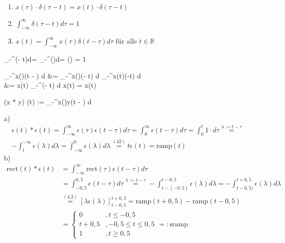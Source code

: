 \documentclass[parskip=half]{scrreprt}
\newcommand{\rect}{\text{rect}}
\newcommand{\ramp}{\text{ramp}}
\newcommand{\sramp}{\text{sramp}}
\begin{document}
\begin{tbox}
 \begin{enumerate}[label=\Roman*)]
 	\item $x(\tau) \cdot \delta(\tau - t) = x(t) \cdot \delta(\tau - t)$
 	\item $\int_{-\infty}^{\infty}\delta(\tau - t)d\tau = 1$
 	\item $x(t) = \int_{-\infty}^{\infty}x(\tau)\delta(t-\tau)d\tau$ für alle $ t \in \mathbb{R}$
 \end{enumerate}
\end{tbox}

\begin{abox}
	\int_{-\infty}^{\infty}\delta(\tau - t)d\tau = \int_{-\infty}^{\infty}\delta(\lambda)d\lambda = \epsilon(\infty) = 1
\end{abox}


\begin{abox}
	\int_{-\infty}^{\infty}x(\tau)\delta(t  - \tau) d \tau &= 	\int_{-\infty}^{\infty}x(\tau)\delta(\tau - t) d \tau {}	\int_{-\infty}^{\infty}x(t)\delta(\tau -t) d \tau \\
	&= x(t)	\int_{-\infty}^{\infty}\delta(\tau - t) d \tau {} x(t)  = x(t)
\end{abox}

\begin{abox}
	(x * y) (t) := 	\int_{-\infty}^{\infty}x(\tau)y(t  - \tau) d \tau
\end{abox}

\begin{tbox}
	a) \begin{align*}\epsilon(t) * \epsilon(t) = \int_{-\infty}^{\infty}\epsilon(\tau)\epsilon(t  - \tau) d \tau = 
	\int_{0}^{\infty}\epsilon(t  - \tau) d \tau = 	\int_{0}^{t}1 \cdot d\tau \overset{\lambda := t-\tau}{=}\\
		-\int_{t}^{-\infty}\epsilon(\lambda) d \lambda = 
			\int_{-\infty}^{0}\epsilon(\lambda) d \lambda \overset{(42)}{=} t\epsilon(t) = \text{ramp}(t)\end{align*}
	b) \begin{align*}
	\text{rect}(t) * \epsilon(t) &= 	\int_{-\infty}^{\infty}\rect(\tau)\epsilon(t  - \tau) d \tau \\&= 
		\int_{-0,5}^{0,5}\epsilon(t  - \tau) d \tau \overset{\lambda := t-\tau}{=}
		-\int_{t-(-0,5)}^{t-0,5}\epsilon(\lambda) d \lambda = 
		-\int_{t-0,5)}^{t+0,5}\epsilon(\lambda) d \lambda\\ &\overset{(4.2)}{=}[\lambda\epsilon(\lambda)]_{t-0,5}^{t+0,5}
		= \ramp(t+0,5) - \ramp(t-0,5)\\
		&= \begin{cases}
		0 &, t \leq -0,5\\
		t+0,5 &, -0,5 \leq t \leq 0,5\\
		1 &, t \geq 0,5
		\end{cases} =: \sramp
		\end{align*}
\end{tbox}
\end{document}
